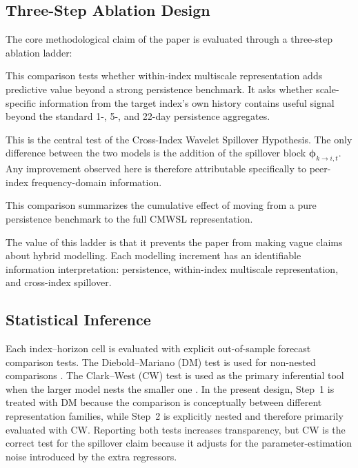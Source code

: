 \subsection{Three-Step Ablation Design}
\label{subsec:ablation_design}

The core methodological claim of the paper is evaluated through a three-step ablation ladder:

\begin{description}[leftmargin=2.6em, style=nextline]
\item[Step~1: HAR $\to$ Wavelet-LGB]
This comparison tests whether within-index multiscale representation adds predictive value beyond a strong persistence benchmark. It asks whether scale-specific information from the target index's own history contains useful signal beyond the standard 1-, 5-, and 22-day persistence aggregates.

\item[Step~2: Wavelet-LGB $\to$ Spillover-LGB]
This is the central test of the Cross-Index Wavelet Spillover Hypothesis. The only difference between the two models is the addition of the spillover block \(\bm{\phi}_{k\to i,t}\). Any improvement observed here is therefore attributable specifically to peer-index frequency-domain information.

\item[Full gap: HAR $\to$ Spillover-LGB]
This comparison summarizes the cumulative effect of moving from a pure persistence benchmark to the full CMWSL representation.
\end{description}

The value of this ladder is that it prevents the paper from making vague claims about hybrid modelling. Each modelling increment has an identifiable information interpretation: persistence, within-index multiscale representation, and cross-index spillover.

\subsection{Statistical Inference}

Each index--horizon cell is evaluated with explicit out-of-sample forecast comparison tests. The Diebold--Mariano (DM) test is used for non-nested comparisons \cite{diebold1995predictive}. The Clark--West (CW) test is used as the primary inferential tool when the larger model nests the smaller one \cite{clark2007nested}. In the present design, Step~1 is treated with DM because the comparison is conceptually between different representation families, while Step~2 is explicitly nested and therefore primarily evaluated with CW. Reporting both tests increases transparency, but CW is the correct test for the spillover claim because it adjusts for the parameter-estimation noise introduced by the extra regressors.

